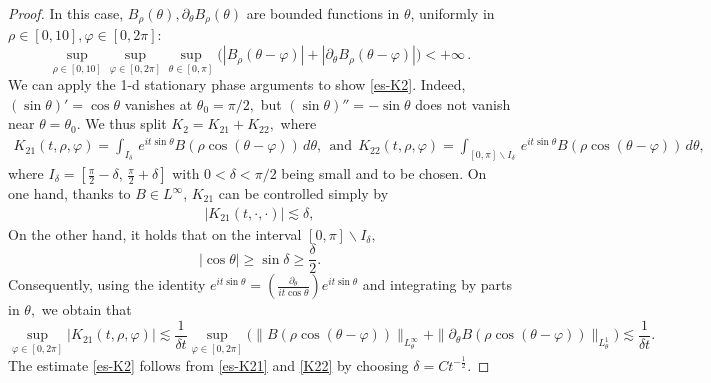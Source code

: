 \documentclass[10pt,a4paper]{amsart}
\let\pa=\partial
\newcommand{\beqs}{\begin{equation*}}
\newcommand{\beq}{\begin{equation}}
\newcommand{\eeqs}{\end{equation*}}
\newcommand{\eeq}{\end{equation}}
\begin{document}
\begin{proof}
	
	In this case, 
	\( B_{\rho}(\theta), \partial_\theta B_{\rho}(\theta) \)  are  bounded functions in \( \theta \), uniformly in \( \rho \in [0,10], \varphi\in [0,2\pi]\): 
	\beq \label{unies-B}
	\sup_{\rho\in[0,10]}\sup_{\varphi\in  [0,2\pi]}\sup_{\theta\in[0,\pi]} \Big(|B_{\rho}(\theta-\varphi)|+|\pa_{\theta} B_{\rho}(\theta-\varphi)|\Big)
	<+\infty\,.
	\eeq\fi
	We can apply the 1-d stationary phase arguments to show \eqref{es-K2}.
	Indeed, $(\sin\theta)'=\cos\theta$ vanishes at 
	$\theta_0=\pi/2,$ but $(\sin\theta)''=-\sin\theta$ does not vanish near $\theta=\theta_0.$ 
	We thus split $K_2=K_{21}+K_{22},$ where 
	\begin{align*}
		K_{21}(t,\rho,\varphi)=\int %
		_{I_{\delta}}\, e^{it \sin\theta} B(\rho \cos (\theta-\varphi)) \, d\theta,
        ~~\text{and}
		~~  
        K_{22}(t,\rho,\varphi)=%
		\int_{[0,\pi]\backslash I_{\delta}}\, e^{it \sin\theta} B(\rho \cos (\theta-\varphi)) \,d\theta, 
	\end{align*}
	where $I_{\delta}=[\frac{\pi}{2}-\delta,\, \frac{\pi}{2}+\delta]$ with
	$0<\delta<\pi/2$ being small and to be chosen. 
	On one hand, thanks to $B\in L^{\infty}$, 
	$K_{21}$ can be controlled simply by 
	\begin{align}\label{es-K21}
		|K_{21}(t,\cdot,\cdot)| \lesssim \delta, 
	\end{align}
	On the other hand, it holds that on the interval $[0,\pi]\backslash I_{\delta},$ 
	\beqs 
	|\cos\theta|\geq \sin\delta\geq \frac{\delta}{2}.
	\eeqs
	Consequently, using the identity $e^{it\sin\theta}=(\frac{\partial_{\theta}}{i t \cos\theta})e^{it\sin\theta}$ and integrating by parts in $\theta,$ we obtain that %
	\beq\label{K22}
	\sup_{\varphi\in  [0,2\pi]}  |K_{21}(t,\rho,\varphi)| \lesssim  \frac{1}{\delta t} \sup_{\varphi\in  [0,2\pi]}  
	\big(\|B(\rho \cos (\theta-\varphi))\|_{L_{\theta}^{\infty}}+\|\pa_{\theta}B(\rho \cos (\theta-\varphi))\|_{L_{\theta}^{1}}\big)
	\lesssim  \frac{1}{\delta t}.
	\eeq
	The estimate \eqref{es-K2} follows from 
	\eqref{es-K21} and \eqref{K22} by choosing $\delta=Ct^{-\frac12}$. 
\end{proof}
\end{document}
